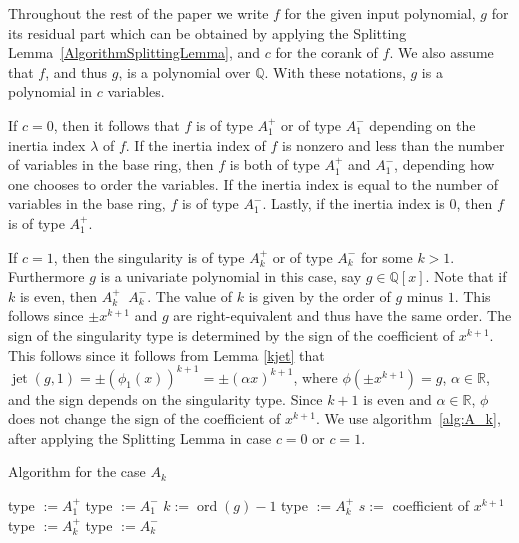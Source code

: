 \documentclass[noend]{amsproc}
\theoremstyle{definition}
\DeclareMathOperator{\ord}{ord}
\DeclareMathOperator{\requiv}{\overset{r}{\sim}}
\DeclareMathOperator{\jt}{jet}
\begin{document}
Throughout the rest of the paper we write $f$ for the given input polynomial,
$g$ for its residual part which can be obtained by applying the Splitting
Lemma~\ref{AlgorithmSplittingLemma}, and $c$ for the corank of $f$.
We also assume that $f$, and thus $g$, is a polynomial over $\mathbb Q$.
With these notations, $g$ is a polynomial in $c$ variables.

If $c = 0$, then it follows  that $f$ is of type
$A_1^+$ or of type $A_1^-$ depending on the inertia index $\lambda$ of $f$. If
the inertia index of $f$ is nonzero and less than the number of variables in
the base ring, then $f$ is both of type $A_1^+$ and $A_1^-$, depending how one
chooses to order the variables. If the inertia index is equal to the number of
variables in the base ring, $f$ is of type $A_1^-$. Lastly, if the inertia
index is $0$, then $f$ is of type $A_1^+$.

If $c=1$, then the singularity is of type
$A_k^+$ or of type $A_k^-$ for some $k>1$. Furthermore $g$ is a univariate
polynomial in this case, say $g\in\mathbb Q[x]$. Note that if $k$ is even, then
$A_k^+\requiv A_k^-$. The value of $k$ is given by the order of $g$ minus $1$.
This follows since $\pm x^{k+1}$ and $g$ are right-equivalent and thus have the
same order. The sign of the singularity type is determined by the sign of the
coefficient of $x^{k+1}$. This follows since it follows from Lemma \ref{kjet}
that $\jt(g,1)=\pm(\phi_1(x))^{k+1}=\pm(\alpha x)^{k+1}$, where $\phi(\pm
x^{k+1})=g$, $\alpha\in\mathbb R$, and the sign depends on the singularity
type.  Since $k+1$ is even and $\alpha\in\mathbb R$, $\phi$ does not change the
sign of the coefficient of $x^{k+1}$. We use algorithm~\ref{alg:A_k}, after
applying the Splitting Lemma in case $c=0$ or $c=1$.

\begin{algorithm}[h]
\caption{\label{alg:A_k} Algorithm for the case $A_k$}
\begin{algorithmic}[1]



\STATE type $:=A_1^+$
\ELSE
\STATE type $:=A_1^-$
\ENDIF
\ENDIF
{}
\STATE $k:= \ord(g)-1$
\STATE type $:=A_k^+$
\ELSE
\STATE $s:=$ coefficient of $x^{k+1}$
\STATE type $:=A_k^+$
\ELSE
\STATE type $:=A_k^-$
\ENDIF
\ENDIF
\ENDIF
{}

\end{algorithmic}
\end{algorithm}
\end{document}
